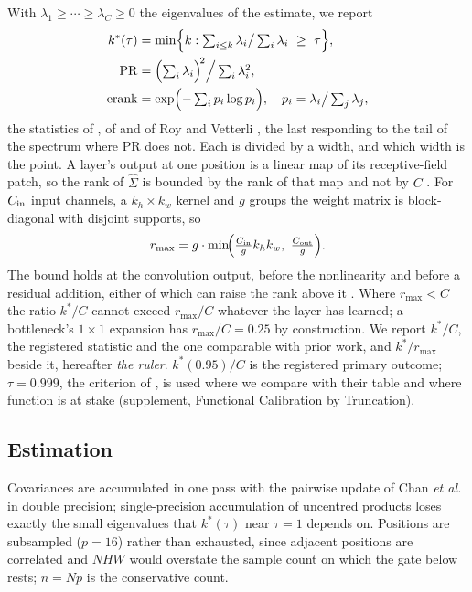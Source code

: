 \documentclass[10pt,journal,compsoc]{IEEEtran}
\begin{document}
With $\lambda_1 \ge \cdots \ge \lambda_C \ge 0$ the eigenvalues of the
estimate, we report
\begin{align}
  k^*(\tau) &= \min\Bigl\{k : \textstyle\sum_{i\le k}\lambda_i
               \big/ \sum_i \lambda_i \ \ge\ \tau \Bigr\},
               \label{eq:kstar}\\
  \mathrm{PR} &= \Bigl(\textstyle\sum_i \lambda_i\Bigr)^{\!2}
                 \Big/ \textstyle\sum_i \lambda_i^2 ,
               \label{eq:pr}\\
  \mathrm{erank} &= \exp\Bigl(-\textstyle\sum_i p_i \log p_i\Bigr),
                    \quad p_i = \lambda_i \big/ \textstyle\sum_j \lambda_j ,
               \label{eq:erank}
\end{align}
the statistics of \cite{garg2019lowEffort}, of \cite{elmoznino2024highDim}
and of Roy and Vetterli \cite{roy2007effectiveRank}, the last responding to
the tail of the spectrum where PR does not. Each is divided by a width, and
which width is the point. A layer's output at one position is a linear map
of its receptive-field patch, so the rank of $\hat{\Sigma}$ is bounded by the
rank of that map and not by $C$ \cite{kim2018rank1,han2021rexnet}. For
$C_{\rm in}$ input channels, a $k_h \times k_w$ kernel and $g$ groups the
weight matrix is block-diagonal with disjoint supports, so
\begin{equation}
  r_{\max} = g \cdot \min\!\Bigl(
     \tfrac{C_{\rm in}}{g} k_h k_w,\ \tfrac{C_{\rm out}}{g}
  \Bigr).
  \label{eq:rmax}
\end{equation}
The bound holds at the convolution output, before the nonlinearity and
before a residual addition, either of which can raise the rank above it
\cite{han2021rexnet}. Where $r_{\max} < C$ the ratio $k^*/C$ cannot exceed
$r_{\max}/C$ whatever the layer has learned; a bottleneck's $1\!\times\!1$
expansion has $r_{\max}/C = 0.25$ by construction. We report $k^*/C$, the
registered statistic and the one comparable with prior work, and
$k^*/r_{\max}$ beside it, hereafter \emph{the ruler}. $k^*(0.95)/C$ is
the registered primary outcome;
$\tau = 0.999$, the criterion of \cite{garg2019lowEffort}, is used where we
compare with their table and where function is at stake
(supplement, Functional Calibration by Truncation).

\subsection{Estimation}

Covariances are accumulated in one pass with the pairwise update of Chan
\emph{et al.} \cite{chan1983variance} in double precision; single-precision
accumulation of uncentred products loses exactly the small eigenvalues that
$k^*(\tau)$ near $\tau = 1$ depends on. Positions are subsampled ($p = 16$)
rather than exhausted, since adjacent positions are correlated and $NHW$
would overstate the sample count on which the gate below rests; $n = Np$ is
the conservative count.
\end{document}
